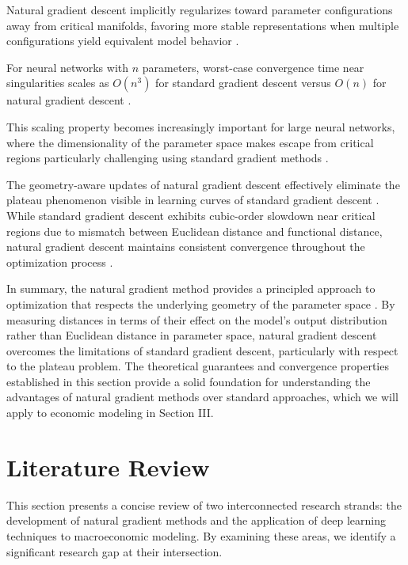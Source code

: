 \documentclass[a4paper]{article}
\begin{document}
\begin{theorem}
Natural gradient descent implicitly regularizes toward parameter configurations away from critical manifolds, favoring more stable representations when multiple configurations yield equivalent model behavior \cite{kunstner2019limitations, martens2015optimizing}.
\end{theorem}

\begin{corollary}
For neural networks with $n$ parameters, worst-case convergence time near singularities scales as $O(n^3)$ for standard gradient descent versus $O(n)$ for natural gradient descent \cite{wei2008dynamics, amari2016information}.
\end{corollary}

This scaling property becomes increasingly important for large neural networks, where the dimensionality of the parameter space makes escape from critical regions particularly challenging using standard gradient methods \cite{martens2015optimizing}.

The geometry-aware updates of natural gradient descent effectively eliminate the plateau phenomenon visible in learning curves of standard gradient descent \cite{pascanu2014saddle}. While standard gradient descent exhibits cubic-order slowdown near critical regions due to mismatch between Euclidean distance and functional distance, natural gradient descent maintains consistent convergence throughout the optimization process \cite{martens2010deep, martens2015optimizing}.

In summary, the natural gradient method provides a principled approach to optimization that respects the underlying geometry of the parameter space \cite{amari1998natural, amari2000methods}. By measuring distances in terms of their effect on the model's output distribution rather than Euclidean distance in parameter space, natural gradient descent overcomes the limitations of standard gradient descent, particularly with respect to the plateau problem. The theoretical guarantees and convergence properties established in this section provide a solid foundation for understanding the advantages of natural gradient methods over standard approaches, which we will apply to economic modeling in Section III.
\section{Literature Review}

This section presents a concise review of two interconnected research strands: the development of natural gradient methods and the application of deep learning techniques to macroeconomic modeling. By examining these areas, we identify a significant research gap at their intersection.
\end{document}
